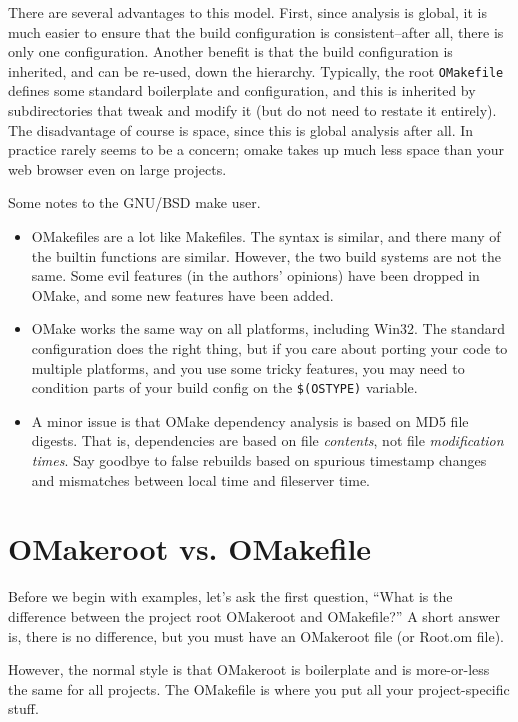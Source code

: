 There are several advantages to this model.  First, since analysis is global, it is much easier to
ensure that the build configuration is consistent--after all, there is only one configuration.
Another benefit is that the build configuration is inherited, and can be re-used, down the
hierarchy.  Typically, the root \verb+OMakefile+ defines some standard boilerplate and
configuration, and this is inherited by subdirectories that tweak and modify it (but do not need to
restate it entirely).  The disadvantage of course is space, since this is global analysis after all.
In practice rarely seems to be a concern; omake takes up much less space than your web browser even
on large projects.

Some notes to the GNU/BSD make user.
\begin{itemize}
\item OMakefiles are a lot like Makefiles.  The syntax is similar, and there many of the builtin
functions are similar.  However, the two build systems are not the same.  Some evil features (in the authors'
opinions) have been dropped in OMake, and some new features have been added.

\item OMake works the same way on all platforms, including Win32.  The standard configuration does
the right thing, but if you care about porting your code to multiple platforms, and you use some
tricky features, you may need to condition parts of your build config on the \verb+$(OSTYPE)+
variable.

\item A minor issue is that OMake dependency analysis is based on MD5 file digests.  That is,
dependencies are based on file \emph{contents}, not file \emph{modification times}.  Say goodbye to
false rebuilds based on spurious timestamp changes and mismatches between local time and fileserver
time.
\end{itemize}

\section{OMakeroot vs. OMakefile}

Before we begin with examples, let's ask the first question, ``What is the difference between the
project root OMakeroot and OMakefile?''  A short answer is, there is no difference, but you must
have an OMakeroot file (or Root.om file).

However, the normal style is that OMakeroot is boilerplate and is more-or-less the same for all
projects.  The OMakefile is where you put all your project-specific stuff.

